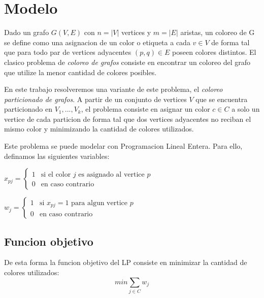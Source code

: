 \section{Modelo}

Dado un grafo $G(V,E)$ con $n = |V|$ vertices y $m = |E|$ aristas,  un coloreo de G se define como una asignacion de un color o etiqueta a cada $v \in V$ de forma tal que para todo  par de vertices adyacentes $(p,q) \in E$ poseen colores distintos. El clasico problema de \textit{coloreo de grafos} consiste en encontrar un coloreo del grafo que utilize la menor cantidad de colores posibles.

En este trabajo resolveremos una variante de este problema, el \textit{coloreo particionado de grafos}. A partir de un conjunto de vertices $V$ que se encuentra particionado en $V_1,...,V_k$, el problema consiste en asignar un color $c \in C$ a solo un vertice de cada particion de forma tal que dos vertices adyacentes no reciban el mismo color y minimizando la cantidad de colores utilizados.

Este problema se puede modelar con Programacion Lineal Entera. Para ello, definamos las siguientes variables:

\hspace{1px}

\begin{center}
$x_{pj} = \begin{cases}
  1 & \text{si el color $j$ es asignado al vertice $p$} \\
  0 & \text{en caso contrario}
\end{cases}$

\hspace{1px}

$w_j = \begin{cases}
  1 & \text{si $x_{pj} = 1$ para algun vertice $p$} \\
  0 & \text{en caso contrario}
\end{cases}$
\end{center}

\subsection{Funcion objetivo}

De esta forma la funcion objetivo del LP consiste en minimizar la cantidad de colores utilizados:
\begin{equation}
min \sum_{j \in C} w_j
\end{equation}

